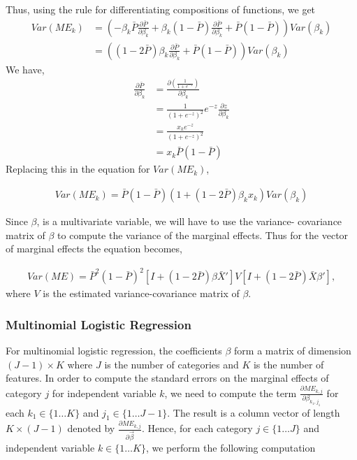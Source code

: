 Thus, using the rule for differentiating compositions of functions, we get
\begin{align*}
  Var(ME_k) & = \left(-\beta_k \bar{P} \frac{\partial \bar{P}}{\partial \beta_k} +
              \beta_k (1-\bar{P})\frac{\partial \bar{P}}{\partial \beta_k} +
              \bar{P}(1-\bar{P}) \right) Var(\beta_k) \\
          & = \left( (1-2\bar{P})\beta_k \frac{\partial \bar{P}}{\partial \beta_k} + \bar{P}(1-\bar{P}) \right) Var(\beta_k)
\end{align*}
We have,
\begin{align*}
  \frac{\partial \bar{P}}{\partial \beta_k} & = \frac{\partial (\frac{1}{1 + e^{-z}})}{\partial \beta_k} \\
                                 & = \frac{1}{(1+e^{-z})^2} e^{-z} \frac{\partial z}{\partial \beta_k} \\
                                 & = \frac{x_k e^{-z}}{(1+e^{-z})^2} \\
                                 & = x_k \bar{P} (1 - \bar{P})
\end{align*}
Replacing this in the equation for $Var(ME_k)$,

\begin{align*}
  Var(ME_k) =  \bar{P}(1-\bar{P}) \left(1 + (1-2\bar{P})\beta_k x_k \right) Var(\beta_k)
\end{align*}

Since $\beta$, is a multivariate variable, we will have to use the variance-
covariance matrix of $\beta$  to compute the variance of the marginal effects.
Thus for the vector of marginal effects the equation becomes,

\begin{gather*}
  Var(ME) = \bar{P}^2(1-\bar{P})^2 \left[I + (1-2\bar{P})\beta \bar{X}' \right] V \left[I+ (1-2\bar{P}) \bar{X} \beta' \right],
\end{gather*}
where $V$ is the estimated variance-covariance matrix of $\beta$.

\subsubsection*{Multinomial Logistic Regression}
For multinomial logistic regression, the coefficients $\beta$ form a matrix of
dimension $(J-1) \times K$ where $J$ is the number of categories and $K$ is the
number of features. In order to compute the standard errors on the marginal
effects of category $j$ for independent variable $k$, we need to compute
the term $\frac{\partial ME_{k,j}} {\partial \beta_{k_1, j_1}}$ for each
$k_1 \in \{1 \ldots K \}$ and $j_1 \in \{1 \ldots J-1 \}$. The result is a column
vector of length $K \times (J-1)$ denoted by
$\frac{\partial ME_{k,j}}{\partial \vec{\beta}}$. Hence, for each category
$j \in \{1 \ldots J\}$ and independent variable $k \in \{1 \ldots K\}$, we
perform the following computation

